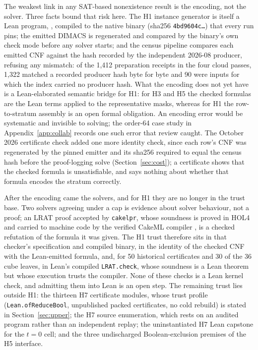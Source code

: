 \documentclass{anvil-paper}
\newcommand{\repobase}{https://github.com/rjwalters/lean-genius/blob/erdos85/integration}
\newcommand{\repofile}[2]{\href{\repobase/#1}{\lean{#2}}}
\newcommand{\cakelpr}{\texttt{cake\textunderscore lpr}}
\theoremstyle{definition}
\begin{document}
The weakest link in any SAT-based nonexistence result is the encoding, not the solver. Three facts bound that risk here. The H1 instance generator is itself a Lean program, \repofile{proofs/Proofs/Erdos85OneHighV2CnfEmit.lean}{Erdos85OneHighV2CnfEmit.lean}, compiled to the native  binary (sha256 \texttt{4bd9604c\ldots}) that every run pins; the emitted DIMACS is regenerated and compared by the binary's own check mode before any solver starts; and the census pipeline compares each emitted CNF against the hash recorded by the independent 2026-08 producer, refusing any mismatch: of the 1,412 preparation receipts in the four cloud passes, 1,322 matched a recorded producer hash byte for byte and 90 were inputs for which the index carried no producer hash. What the encoding does not yet have is a Lean-elaborated semantic bridge for H1: for H3 and H5 the checked formulas are the Lean terms  applied to the representative masks, whereas for H1 the row-to-stratum assembly is an open formal obligation. An encoding error would be systematic and invisible to solving; the order-64 case study in Appendix~\ref{app:collab} records one such error that review caught. The October 2026 certificate check added one more identity check, since each row's CNF was regenerated by the pinned emitter and its sha256 required to equal the census hash before the proof-logging solve (Section~\ref{sec:cost}); a certificate shows that the checked formula is unsatisfiable, and says nothing about whether that formula encodes the stratum correctly.

After the encoding came the solvers, and for H1 they are no longer in the trust base. Two solvers agreeing under a cap is evidence about solver behaviour, not a proof; an LRAT proof accepted by \cakelpr{}, whose soundness is proved in HOL4 and carried to machine code by the verified CakeML compiler \citep{tan2021cakelpr}, is a checked refutation of the formula it was given. The H1 trust therefore sits in that checker's specification and compiled binary, in the identity of the checked CNF with the Lean-emitted formula, and, for 50 historical certificates and 30 of the 36 cube leaves, in Lean's compiled \texttt{LRAT.check}, whose soundness is a Lean theorem but whose execution trusts the compiler. None of these checks is a Lean kernel check, and admitting them into Lean is an open step. The remaining trust lies outside H1: the thirteen H7 certificate modules, whose trust profile (\texttt{Lean.ofReduceBool}, unpublished packed certificates, no cold rebuild) is stated in Section~\ref{sec:upper}; the H7 source enumeration, which rests on an audited program rather than an independent replay; the uninstantiated H7 Lean capstone for the $t=0$ cell; and the three undischarged Boolean-exclusion premises of the H5 interface.
\end{document}
